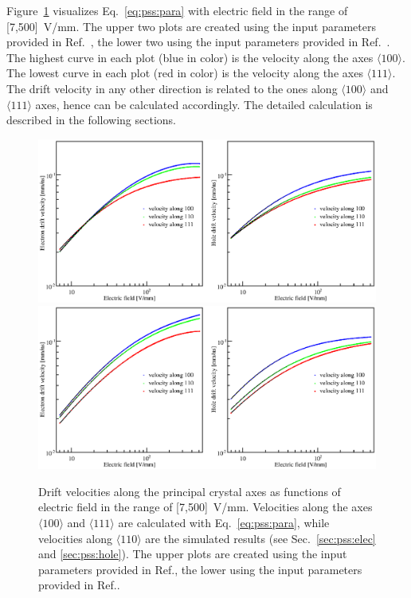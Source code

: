 Figure~\ref{fig:pss:vvse} visualizes Eq.~\ref{eq:pss:para} with electric field in the range of [7,500]~V/mm. The upper two plots are created using the input parameters provided in Ref.~\cite{miha}, the lower two using the input parameters provided in Ref.~\cite{bart}. The highest curve in each plot (blue in color) is the velocity along the axes $\langle 100 \rangle$. The lowest curve in each plot (red in color) is the velocity along the axes $\langle 111 \rangle$. The drift velocity in any other direction is related to the ones along  $\langle 100 \rangle$ and $\langle 111 \rangle$ axes, hence can be calculated accordingly. The detailed calculation is described in the following sections.

\begin{figure}[tbhp]
\centering
\includegraphics[width=\textwidth]{VvsElucian} \\\hfil
\includegraphics[width=\textwidth]{VvsEbart}
\caption{Drift velocities along the principal crystal axes as functions of electric field in the range of [7,500]~V/mm. Velocities along the axes $\langle 100 \rangle$ and $\langle 111 \rangle$ are calculated with Eq.~\ref{eq:pss:para}, while velocities along $\langle 110 \rangle$ are the simulated results (see Sec.~\ref{sec:pss:elec} and \ref{sec:pss:hole}). The upper plots are created using the input parameters provided in Ref.\cite{miha}, the lower using the input parameters provided in Ref.\cite{bart}.}
\label{fig:pss:vvse}
\end{figure}

